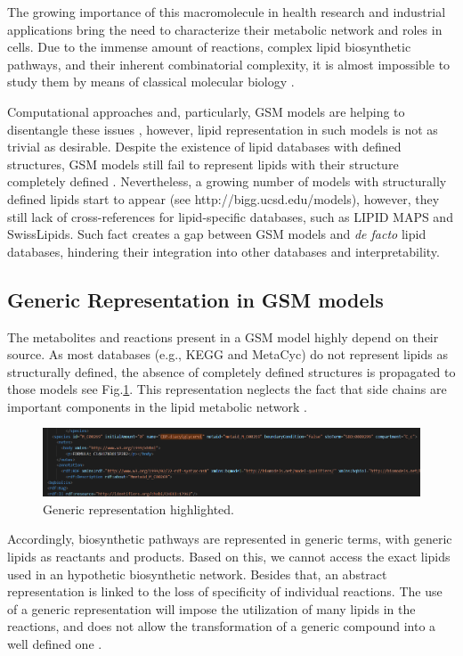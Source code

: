 \documentclass{llncs}
\begin{document}
The growing importance of this macromolecule in health research and industrial applications bring the need to characterize their metabolic network and roles in cells.
Due to the immense amount of reactions, complex lipid biosynthetic pathways, and their inherent combinatorial complexity, it is almost impossible to study them by means of classical molecular biology \cite{Schutzhold}.

Computational approaches and, particularly, GSM models are helping to disentangle these issues \cite{Schutzhold}, however, lipid representation in such models is not as trivial as desirable.
Despite the existence of lipid databases with defined structures, GSM models still fail to represent lipids with their structure completely defined \cite{Aung2013}. Nevertheless, a growing number of models with structurally defined lipids start to appear (see http://bigg.ucsd.edu/models), however, they still lack of cross-references for lipid-specific databases, such as LIPID MAPS and SwissLipids. Such fact creates a gap between GSM models and \textit{de facto} lipid databases, hindering their integration into other databases and interpretability.


\subsection{Generic Representation in GSM models}
The metabolites and reactions present in a GSM model highly depend on their source. As most databases (e.g., KEGG and MetaCyc) do not represent lipids as structurally defined, the absence of completely defined structures is propagated to those models see Fig.\ref{fig2}. 
This representation neglects the fact that side chains are important components in the lipid metabolic network \cite{Schutzhold,Aung2013,Sanchez2019}.

\begin{figure}
    \includegraphics[width=\textwidth]{imagens/generica.png}
    \caption{Generic representation highlighted.} \label{fig2}
\end{figure}

Accordingly, biosynthetic pathways are represented in generic terms, with generic lipids as reactants and products.
Based on this, we cannot access the exact lipids used in an hypothetic biosynthetic network.
Besides that, an abstract representation is linked to the loss of specificity of individual reactions. 
The use of a generic representation will impose the utilization of many lipids in the reactions, and does not allow the transformation of a generic compound into a well defined one \cite{Aung2013}.
\end{document}
